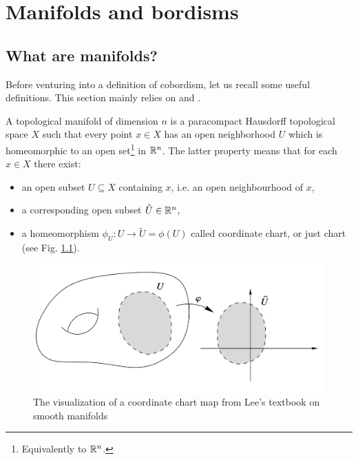 \chapter{Manifolds and bordisms}

\section{What are manifolds?} %
\label{sec:some_definitions}

Before venturing into a definition of cobordism, let us recall some useful definitions.
This section mainly relies on \cite{Lee2012} and \cite{Hirsch1976}.
\begin{defn}
    A topological manifold of dimension $n$ is a paracompact Hausdorff topological space $X$ such that every point $x \in X$ has an open neighborhood $U$ which is homeomorphic to an open set\footnote{Equivalently to $\mathbb{R}^n$.} in $\mathbb{R}^n$. The latter property means that for each $x\in X$ there exist:
    \begin{itemize}
        \item an open subset $U\subseteq X$ containing $x$, i.e. an open neighbourhood of $x$,
        \item a corresponding open subset $\tilde{U}\in\mathbb{R}^n$,
        \item a homeomorphism $\phi_{U} : U \to \tilde{U}=\phi(U) $ called coordinate chart, or just chart (see Fig. \ref{fig:Coordinate_Chart}).
    \end{itemize} 
 \end{defn}
\begin{figure}
    \centering
    \captionsetup{format = hang}
    \includegraphics[width=12cm]{images/Lecture 2/Coordinate Chart.png} 
    \caption{\small{The visualization of a coordinate chart map from Lee's textbook on smooth manifolds \cite{Lee2012}}}
    \label{fig:Coordinate_Chart}
\end{figure}

